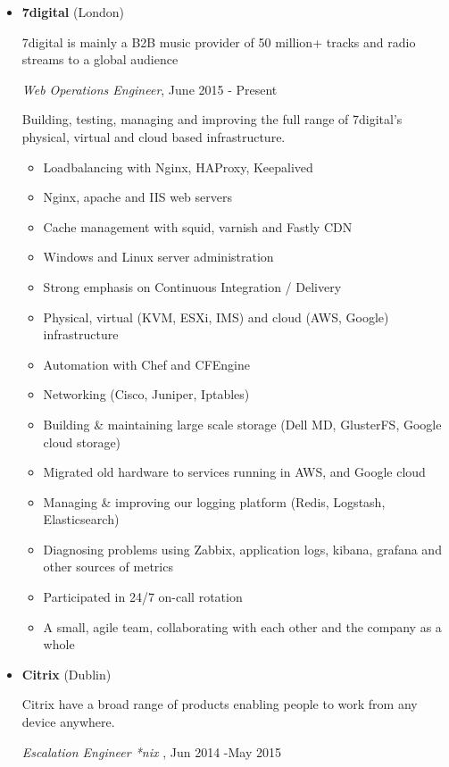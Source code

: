 \documentclass[]{article}
\providecommand{\tightlist}{%
  \setlength{\itemsep}{0pt}\setlength{\parskip}{0pt}}
\begin{document}
\begin{itemize}
\item
  \textbf{7digital} (London)

  7digital is mainly a B2B music provider of 50 million+ tracks and
  radio streams to a global audience

  \emph{Web Operations Engineer}, June 2015 - Present

  Building, testing, managing and improving the full range of 7digital's
  physical, virtual and cloud based infrastructure.

  \begin{itemize}
  \tightlist
  \item
    Loadbalancing with Nginx, HAProxy, Keepalived
  \item
    Nginx, apache and IIS web servers
  \item
    Cache management with squid, varnish and Fastly CDN
  \item
    Windows and Linux server administration
  \item
    Strong emphasis on Continuous Integration / Delivery
  \item
    Physical, virtual (KVM, ESXi, IMS) and cloud (AWS, Google)
    infrastructure
  \item
    Automation with Chef and CFEngine
  \item
    Networking (Cisco, Juniper, Iptables)
  \item
    Building \& maintaining large scale storage (Dell MD, GlusterFS,
    Google cloud storage)
  \item
    Migrated old hardware to services running in AWS, and Google cloud
  \item
    Managing \& improving our logging platform (Redis, Logstash,
    Elasticsearch)
  \item
    Diagnosing problems using Zabbix, application logs, kibana, grafana
    and other sources of metrics
  \item
    Participated in 24/7 on-call rotation
  \item
    A small, agile team, collaborating with each other and the company
    as a whole
  \end{itemize}
\item
  \textbf{Citrix} (Dublin)

  Citrix have a broad range of products enabling people to work from any
  device anywhere.

  \emph{Escalation Engineer *nix }, Jun 2014 -May 2015


\end{itemize}
\end{document}
